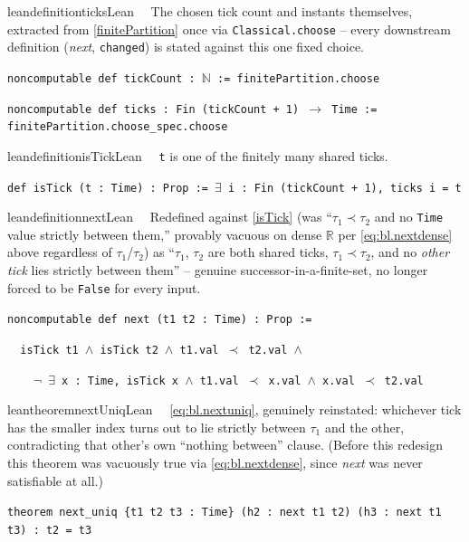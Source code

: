 \begin{restatable}{leandefinition}{ticksLean}~~ The chosen tick count and
instants themselves, extracted from \ref{finitePartition} once via \texttt{Classical.choose} -- every
downstream definition (\textit{next}, \texttt{changed}) is stated against this one fixed choice.

\texttt{\textcolor{leancolor}{noncomputable def} \textcolor{leanyellow}{tickCount} : $\mathbb{N}$ := finitePartition.choose}

\texttt{\textcolor{leancolor}{noncomputable def} \textcolor{leanyellow}{ticks} : Fin (tickCount + 1) $\to$ Time := finitePartition.choose\_spec.choose}
\label{ticks}
\end{restatable}

\begin{restatable}{leandefinition}{isTickLean}~~ \texttt{t} is one of the finitely many
shared ticks.

\texttt{\textcolor{leancolor}{def} \textcolor{leanyellow}{isTick} (t : Time) : Prop := $\exists$ i : Fin (tickCount + 1), ticks i = t}
\label{isTick}
\end{restatable}

\begin{restatable}{leandefinition}{nextLean}~~ Redefined against \ref{isTick} (was
``$\tau_1 \prec \tau_2$ and no \texttt{Time} value strictly between them,'' provably vacuous on dense
$\mathbb{R}$ per \eqref{eq:bl.nextdense} above regardless of $\tau_1$/$\tau_2$) as ``$\tau_1$, $\tau_2$ are both
shared ticks, $\tau_1 \prec \tau_2$, and no \emph{other tick} lies strictly between them'' -- genuine
successor-in-a-finite-set, no longer forced to be \texttt{False} for every input.

\texttt{\textcolor{leancolor}{noncomputable def} \textcolor{leanyellow}{next} (t1 t2 : Time) : Prop :=}

\texttt{~~isTick t1 $\wedge$ isTick t2 $\wedge$ t1.val $\prec$ t2.val $\wedge$}

\texttt{~~~~$\lnot$ $\exists$ x : Time, isTick x $\wedge$ t1.val $\prec$ x.val $\wedge$ x.val $\prec$ t2.val}
\label{nextLean}
\end{restatable}

\begin{restatable}{leantheorem}{nextUniqLean}~~ \eqref{eq:bl.nextuniq}, genuinely
reinstated: whichever tick has the smaller index turns out to lie strictly between $\tau_1$ and the other,
contradicting that other's own ``nothing between'' clause. (Before this redesign this theorem was
vacuously true via \eqref{eq:bl.nextdense}, since \textit{next} was never satisfiable at all.)

\texttt{\textcolor{leancolor}{theorem} \textcolor{leanyellow}{next\_uniq} \{t1 t2 t3 : Time\} (h2 : next t1 t2) (h3 : next t1 t3) : t2 = t3}
\label{next_uniq}
\end{restatable}

